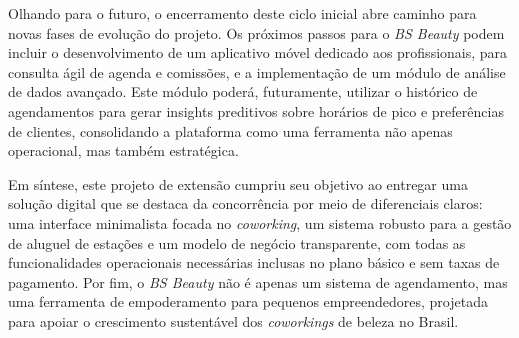 Olhando para o futuro, o encerramento deste ciclo inicial abre caminho para novas fases de evolução do projeto. Os próximos passos para o \emph{BS Beauty} podem incluir o desenvolvimento de um aplicativo móvel dedicado aos profissionais, para consulta ágil de agenda e comissões, e a implementação de um módulo de análise de dados avançado. Este módulo poderá, futuramente, utilizar o histórico de agendamentos para gerar insights preditivos sobre horários de pico e preferências de clientes, consolidando a plataforma como uma ferramenta não apenas operacional, mas também estratégica.

Em síntese, este projeto de extensão cumpriu seu objetivo ao entregar uma solução digital que se destaca da concorrência por meio de diferenciais claros: uma interface minimalista focada no \emph{coworking}, um sistema robusto para a gestão de aluguel de estações e um modelo de negócio transparente, com todas as funcionalidades operacionais necessárias inclusas no plano básico e sem taxas de pagamento. Por fim, o \emph{BS Beauty} não é apenas um sistema de agendamento, mas uma ferramenta de empoderamento para pequenos empreendedores, projetada para apoiar o crescimento sustentável dos \emph{coworkings} de beleza no Brasil.
